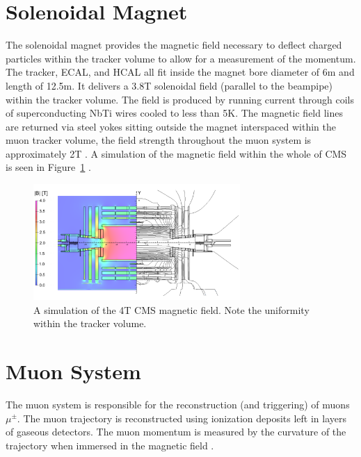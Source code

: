 \section{Solenoidal Magnet}

The solenoidal magnet provides the magnetic field necessary to deflect charged particles within the tracker volume to allow for a measurement of the momentum. The tracker, ECAL, and HCAL all fit inside the magnet bore diameter of 6m and length of 12.5m. It delivers a 3.8T solenoidal field (parallel to the beampipe) within the tracker volume. The field is produced by running current through coils of superconducting NbTi wires cooled to less than 5K. The magnetic field lines are returned via steel yokes sitting outside the magnet interspaced within the muon tracker volume, the field strength throughout the muon system is approximately 2T \cite{magnettdr}. A simulation of the magnetic field within the whole of CMS is seen in Figure~\ref{fig:magnet} \cite{magnet}.

\begin{figure}[hbp!]
\centering
\includegraphics[width=0.7\textwidth]{figs/magnet.png}
\caption[A simulation of the 4T CMS magnetic field.]
{A simulation of the 4T CMS magnetic field. Note the uniformity within the tracker volume.}
\label{fig:magnet}
\end{figure}

\section{Muon System}

The muon system is responsible for the reconstruction (and triggering) of muons $\mu^{\pm}$. The muon trajectory is reconstructed using ionization deposits left in layers of gaseous detectors. The muon momentum is measured by the curvature of the trajectory when immersed in the magnetic field \cite{muontdr}.

